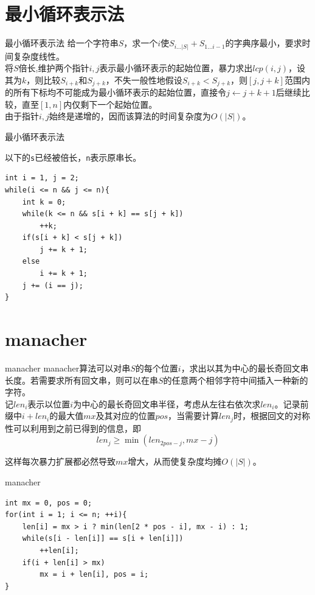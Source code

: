 \documentclass{beamer}
\begin{document}
\section{最小循环表示法}
\begin{frame}{最小循环表示法}
	给一个字符串$S$，求一个$i$使$S_{i...|S|}+S_{1...i-1}$的字典序最小，要求时间复杂度线性。
	\pause\\
	
	将$S$倍长,维护两个指针$i,j$表示最小循环表示的起始位置，暴力求出$lcp(i,j)$，设其为$k$，则比较$S_{i+k}$和$S_{j+k}$，不失一般性地假设$S_{i+k}<S_{j+k}$，则$[j,j+k]$范围内的所有下标均不可能成为最小循环表示的起始位置，直接令$j \gets j+k+1$后继续比较，直至$[1,n]$内仅剩下一个起始位置。
	\\
	
	由于指针$i,j$始终是递增的，因而该算法的时间复杂度为$O(|S|)$。
\end{frame}
\begin{frame}[fragile]{最小循环表示法}
	
	以下的\texttt{s}已经被倍长，\texttt{n}表示原串长。
	
\begin{verbatim}
int i = 1, j = 2;
while(i <= n && j <= n){
    int k = 0;
    while(k <= n && s[i + k] == s[j + k])
        ++k;
    if(s[i + k] < s[j + k])
        j += k + 1;
    else
        i += k + 1;
    j += (i == j);
}
\end{verbatim}		
\end{frame}
\section{manacher}
\begin{frame}{manacher}
	manacher算法可以对串$S$的每个位置$i$，求出以其为中心的最长奇回文串长度。若需要求所有回文串，则可以在串$S$的任意两个相邻字符中间插入一种新的字符。
	\\
	
	记$len_i$表示以位置$i$为中心的最长奇回文串半径，考虑从左往右依次求$len_i$。记录前缀中$i+len_i$的最大值$mx$及其对应的位置$pos$，当需要计算$len_j$时，根据回文的对称性可以利用到之前已得到的信息，即$$len_j \ge \min(len_{2pos-j},mx-j)$$
	
	这样每次暴力扩展都必然导致$mx$增大，从而使复杂度均摊$O(|S|)$。
\end{frame}
\begin{frame}[fragile]{manacher}
\begin{verbatim}
int mx = 0, pos = 0;
for(int i = 1; i <= n; ++i){
    len[i] = mx > i ? min(len[2 * pos - i], mx - i) : 1;
    while(s[i - len[i]] == s[i + len[i]])
        ++len[i];
    if(i + len[i] > mx)
        mx = i + len[i], pos = i;
}
\end{verbatim}
\end{frame}
\end{document}

